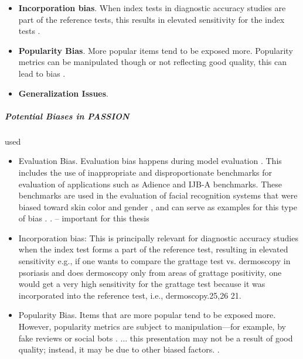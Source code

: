 \begin{refsection}
\begin{itemize}
			\item  \textbf{Incorporation bias}. When index tests in diagnostic accuracy studies are part of the reference tests, this results in elevated sensitivity for the index tests \autocites{Chakraborty_2024, c21, c25, c26}{Young_2020}.
			
			\item \textbf{Popularity Bias}. More popular items tend to be exposed more. Popularity metrics can be manipulated though or not reflecting good quality, this can lead to bias \autocites{M117_Ciampaglia_2018}{Mehrabi_2021}.
			
			\item \textbf{Generalization Issues}.  \autocite{} 
		\end{itemize}
		
		
		\subparagraph{Potential Biases in PASSION}
		
		\rawcitationstart
		used
		\begin{itemize}		
			\rawcitationusedstart
			\item Evaluation Bias. Evaluation bias happens during model evaluation \autocite{M144_Suresh_2021}. This includes the use of inappropriate and disproportionate benchmarks for evaluation of applications such as Adience and IJB-A benchmarks. These benchmarks are used in the evaluation of facial recognition systems that were biased toward skin color and gender \autocite{M24_Buolamwini_2018}, and can serve as examples for this type of bias \autocite{M144_Suresh_2021}. \autocite{Mehrabi_2021}. -- important for this thesis
			
			\item  Incorporation bias: This is principally relevant for diagnostic accuracy studies when the index test forms a part of the reference test, resulting in elevated sensitivity e.g., if one wants to compare the grattage test vs. dermoscopy in psoriasis and does dermoscopy only from areas of grattage positivity, one would get a very high sensitivity for the grattage test because it was incorporated into the reference test, i.e., dermoscopy.25,26 21.\autocite{Chakraborty_2024}
			
			\item Popularity Bias. Items that are more popular tend to be exposed more. However, popularity metrics are subject to manipulation—for example, by fake reviews or social bots \autocite{M117_Ciampaglia_2018}. ... this presentation may not be a result of good quality; instead, it may be due to other biased factors. \autocite{Mehrabi_2021}.
			\rawcitationusedend
		\end{itemize}
		\rawcitationend
		

\end{refsection}

